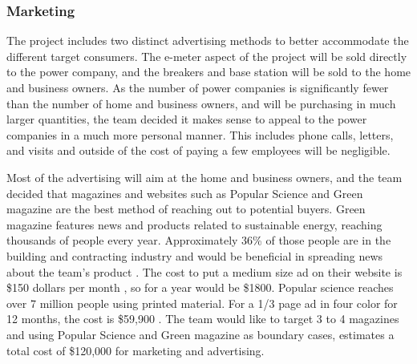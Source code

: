 			


\subsubsection{Marketing}
The project includes two distinct advertising methods to better accommodate the different target consumers. The e-meter aspect of the project will be sold directly to the power company, and the breakers and base station will be sold to the home and business owners. As the number of power companies is significantly fewer than the number of home and business owners, and will be purchasing in much larger quantities, the team decided it makes sense to appeal to the power companies in a much more personal manner. This includes phone calls, letters, and visits and outside of the cost of paying a few employees will be negligible. 

Most of the advertising will aim at the home and business owners, and the team decided that magazines and websites such as Popular Science and Green magazine are the best method of reaching out to potential buyers.  Green magazine features news and products related to sustainable energy, reaching thousands of people every year. Approximately 36\% of those people are in the building and contracting industry and would be beneficial in spreading news about the team's product \cite{GreenMediaKit}. The cost to put a medium size ad on their website is \$150 dollars per month \cite{GreenMediaKit}, so for a year would be \$1800. Popular science reaches over 7 million people using printed material. For a 1/3 page ad in four color for 12 months, the cost is \$59,900 \cite{PopSci}. The team would like to target 3 to 4 magazines and using Popular Science and Green magazine as boundary cases, estimates a total cost of \$120,000 for marketing and advertising. 

